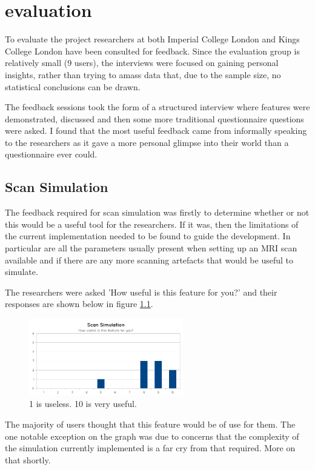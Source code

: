 \chapter{evaluation}\label{chapter:evaluation}

To evaluate the project researchers at both Imperial College London and Kings College London have been consulted for feedback. Since the evaluation group is relatively small (9 users), the interviews were focused on gaining personal insights, rather than trying to amass data that, due to the sample size, no statistical conclusions can be drawn.

The feedback sessions took the form of a structured interview where features were demonstrated, discussed and then some more traditional questionnaire questions were asked. I found that the most useful feedback came from informally speaking to the researchers as it gave a more personal glimpse into their world than a questionnaire ever could. 

\section{Scan Simulation}
The feedback required for scan simulation was firstly to determine whether or not this would be a useful tool for the researchers. If it was, then the limitations of the current implementation needed to be found to guide the development. In particular are all the parameters usually present when setting up an MRI scan available and if there are any more scanning artefacts that would be useful to simulate.

The researchers were asked 'How useful is this feature for you?' and their responses are shown below in figure \ref{fig:graph_scansimulation_1}.

\begin{figure}[h]
    \centering
	\includegraphics[width=0.6\textwidth]{images/evaluation/graph_scan_simulation_1.png}
    \caption{1 is useless. 10 is very useful.}\label{fig:graph_scansimulation_1}
\end{figure}

The majority of users thought that this feature would be of use for them. The one notable exception on the graph was due to concerns that the complexity of the simulation currently implemented is a far cry from that required. More on that shortly.

